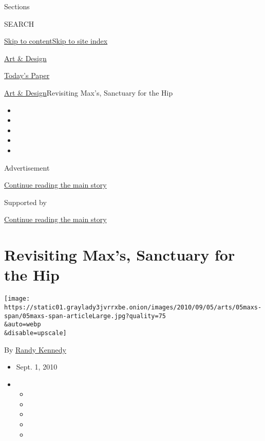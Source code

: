 Sections

SEARCH

\protect\hyperlink{site-content}{Skip to
content}\protect\hyperlink{site-index}{Skip to site index}

\href{https://www.nytimes3xbfgragh.onion/section/arts/design}{Art \&
Design}

\href{https://myaccount.nytimes3xbfgragh.onion/auth/login?response_type=cookie\&client_id=vi}{}

\href{https://www.nytimes3xbfgragh.onion/section/todayspaper}{Today's
Paper}

\href{/section/arts/design}{Art \& Design}\textbar{}Revisiting Max's,
Sanctuary for the Hip

\begin{itemize}
\item
\item
\item
\item
\item
\end{itemize}

Advertisement

\protect\hyperlink{after-top}{Continue reading the main story}

Supported by

\protect\hyperlink{after-sponsor}{Continue reading the main story}

\hypertarget{revisiting-maxs-sanctuary-for-the-hip}{%
\section{Revisiting Max's, Sanctuary for the
Hip}\label{revisiting-maxs-sanctuary-for-the-hip}}

\texttt{[image: https://static01.graylady3jvrrxbe.onion/images/2010/09/05/arts/05maxs-span/05maxs-span-articleLarge.jpg?quality=75\\\&auto=webp\\\&disable=upscale]}

By \href{https://www.nytimes3xbfgragh.onion/by/randy-kennedy}{Randy
Kennedy}

\begin{itemize}
\item
  Sept. 1, 2010
\item
  \begin{itemize}
  \item
  \item
  \item
  \item
  \item
  \end{itemize}
\end{itemize}

